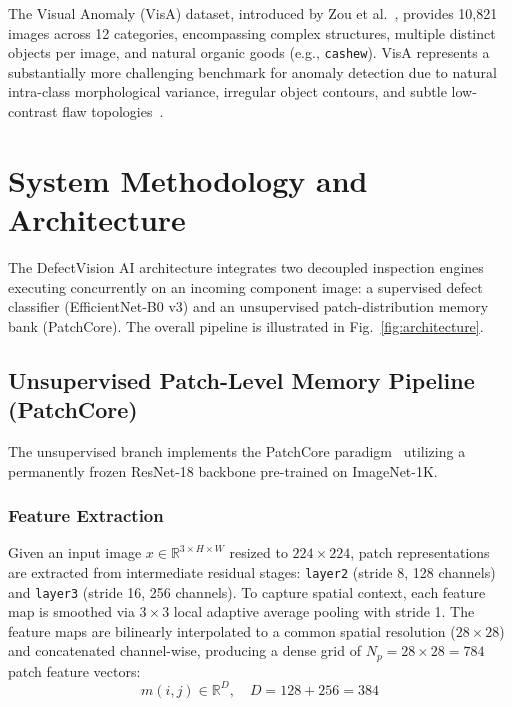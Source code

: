 \documentclass[journal]{IEEEtran}
\begin{document}
The Visual Anomaly (VisA) dataset, introduced by Zou et al.~\cite{zou2022spot}, provides 10,821 images across 12 categories, encompassing complex structures, multiple distinct objects per image, and natural organic goods (e.g., \texttt{cashew}). VisA represents a substantially more challenging benchmark for anomaly detection due to natural intra-class morphological variance, irregular object contours, and subtle low-contrast flaw topologies~\cite{zou2022spot}.

\section{System Methodology and Architecture}
The DefectVision AI architecture integrates two decoupled inspection engines executing concurrently on an incoming component image: a supervised defect classifier (EfficientNet-B0 v3) and an unsupervised patch-distribution memory bank (PatchCore). The overall pipeline is illustrated in Fig.~\ref{fig:architecture}.

\subsection{Unsupervised Patch-Level Memory Pipeline (PatchCore)}
The unsupervised branch implements the PatchCore paradigm~\cite{roth2022towards} utilizing a permanently frozen ResNet-18 backbone pre-trained on ImageNet-1K.

\subsubsection{Feature Extraction}
Given an input image $x \in \mathbb{R}^{3 \times H \times W}$ resized to $224 \times 224$, patch representations are extracted from intermediate residual stages: \texttt{layer2} (stride 8, 128 channels) and \texttt{layer3} (stride 16, 256 channels). To capture spatial context, each feature map is smoothed via $3 \times 3$ local adaptive average pooling with stride 1. The feature maps are bilinearly interpolated to a common spatial resolution ($28 \times 28$) and concatenated channel-wise, producing a dense grid of $N_p = 28 \times 28 = 784$ patch feature vectors:
\begin{equation}
m(i,j) \in \mathbb{R}^{D}, \quad D = 128 + 256 = 384
\end{equation}
\end{document}
